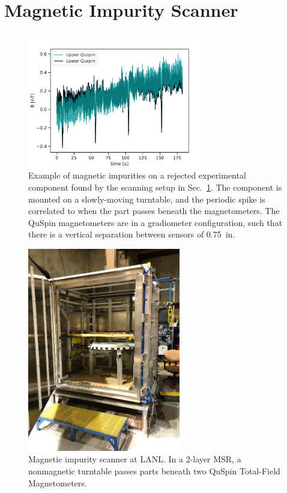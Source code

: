 
\section{Magnetic Impurity Scanner}\label{sec:magnetic_impurity_scanner}


\begin{figure}
    \centering
    \includegraphics[width=0.7\textwidth]{figures/magnetic_contamination_example.pdf}
    \caption
      {Example of magnetic impurities on a rejected experimental component found by the scanning setup in Sec.~\ref{sec:magnetic_impurity_scanner}. The component is mounted on a slowly-moving turntable, and the periodic spike is correlated to when the part passes beneath the magnetometers. The QuSpin magnetometers are in a gradiometer configuration, such that there is a vertical separation between sensors of \qty{0.75}{in}.}
    \label{fig:magnetic_contamination_example}
\end{figure}

\begin{figure}
    \centering
    \includegraphics[height=3.5in]{figures/magnetic_impurity_scanner.png}
    \caption
      {Magnetic impurity scanner at LANL. In a 2-layer MSR, a nonmagnetic turntable passes parts beneath two QuSpin Total-Field Magnetometers.}
    \label{fig:magnetic_impurity_scanner}
\end{figure}

